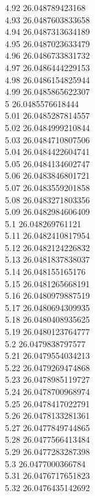 {4.92	26.048789423168\\
4.93	26.0487603833658\\
4.94	26.0487313634189\\
4.95	26.0487023633479\\
4.96	26.0486733831732\\
4.97	26.0486444229153\\
4.98	26.0486154825944\\
4.99	26.0485865622307\\
5	26.0485576618444\\
5.01	26.0485287814557\\
5.02	26.0484999210844\\
5.03	26.0484710807506\\
5.04	26.0484422604741\\
5.05	26.0484134602747\\
5.06	26.0483846801721\\
5.07	26.0483559201858\\
5.08	26.0483271803356\\
5.09	26.0482984606409\\
5.1	26.048269761121\\
5.11	26.0482410817954\\
5.12	26.0482124226832\\
5.13	26.0481837838037\\
5.14	26.048155165176\\
5.15	26.0481265668191\\
5.16	26.0480979887519\\
5.17	26.0480694309935\\
5.18	26.0480408935625\\
5.19	26.0480123764777\\
5.2	26.0479838797577\\
5.21	26.0479554034213\\
5.22	26.0479269474868\\
5.23	26.0478985119727\\
5.24	26.0478700968974\\
5.25	26.0478417022791\\
5.26	26.0478133281361\\
5.27	26.0477849744865\\
5.28	26.0477566413484\\
5.29	26.0477283287398\\
5.3	26.0477000366784\\
5.31	26.0476717651823\\
5.32	26.0476435142692\\
}
